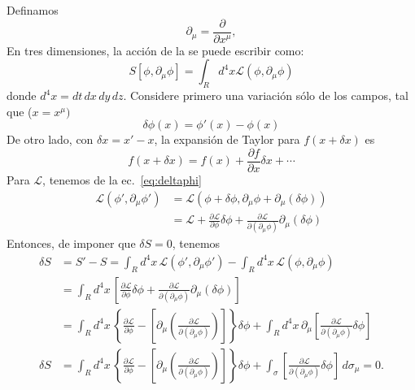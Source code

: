 Definamos
\begin{equation}
  \label{eq:dmu}
  \partial_\mu=\frac{\partial}{\partial x^\mu},
  \end{equation}
En tres dimensiones, la acción de la se puede escribir como:
\begin{equation}
  \label{eq:Scall3d}
  S[\phi,\partial_\mu\phi]=\int_{R}d^4x\mathcal{L}(\phi,\partial_\mu\phi)
\end{equation}
donde $d^4x=d t\,d x\, d y\,d z$.  Considere primero una variación sólo de
los campos, tal que ($x=x^\mu)$
\begin{equation}
  \label{eq:deltaphi}
  \delta\phi(x)=\phi'(x)-\phi(x)
\end{equation}
De otro lado, con $\delta x=x'-x$, la expansión de Taylor para $f(x+\delta x)$ es
\begin{equation}
  f(x+\delta x)=f(x)+\frac{\partial f}{\partial x}\delta x+\cdots 
\end{equation}
Para $\mathcal{L}$, tenemos de la ec.~\eqref{eq:deltaphi}
\begin{align}
  \mathcal{L}(\phi',\partial_\mu\phi')&=\mathcal{L}(\phi+\delta\phi,\partial_\mu\phi+\partial_\mu(\delta\phi))\nonumber\\
  &=\mathcal{L}+\frac{\partial\mathcal{L}}{\partial\phi}\delta\phi+\frac{\partial\mathcal{L}}{\partial(\partial_\mu\phi)}\partial_\mu(\delta\phi)
\end{align}
Entonces, de imponer que $\delta S=0$, tenemos
\begin{align}
  \delta S&=S'-S=\int_{R}d^4x\,\mathcal{L}(\phi',\partial_\mu\phi')-\int_{R}d^4x\,\mathcal{L}(\phi,\partial_\mu\phi)\nonumber\\
&=\int_{R}d^4x\,
\left[
\frac{\partial\mathcal{L}}{\partial\phi}\delta\phi+\frac{\partial\mathcal{L}}{\partial(\partial_\mu\phi)}\partial_\mu(\delta\phi)
\right]\nonumber\\
 &=\int_{R}d^4x\,
  \left\{ 
    \frac{\partial\mathcal{L}}{\partial\phi}-\left[\partial_\mu\left(
      \frac{\partial\mathcal{L}}{\partial(\partial_\mu\phi)}
    \right)\right]
  \right\}\delta\phi+\int_{R}d^4x\,
    \partial_\mu\left[
      \frac{\partial\mathcal{L}}{\partial(\partial_\mu\phi)}\delta\phi
    \right]\nonumber\\
\label{eq:1qft}
\delta S&=\int_{R}d^4x\,
  \left\{ 
    \frac{\partial\mathcal{L}}{\partial\phi}-    
    \left[\partial_\mu\left(
      \frac{\partial\mathcal{L}}{\partial(\partial_\mu\phi)}
    \right)\right]
  \right\}\delta\phi+\int_{\sigma}\left[
      \frac{\partial\mathcal{L}}{\partial(\partial_\mu\phi)}\delta\phi
    \right]\,d\sigma_\mu=0.
\end{align}
